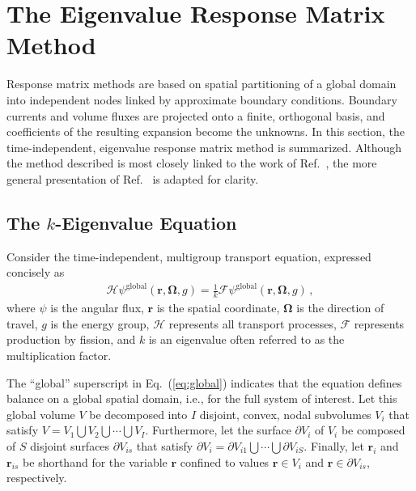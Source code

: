 \documentclass[5p,times,twocolumn,10pt]{elsarticle}
\newcommand{\oper}[1]{\mathcal{#1}}
\newcommand{\EQ}[1]{Eq.~(\ref{#1})}               %
\newcommand{\REF}[1]{Ref.~\citen{#1}}               %
\begin{document}
    \section{The Eigenvalue Response Matrix Method}
    
    Response matrix methods are based on spatial partitioning of a global 
    domain 
    into independent nodes linked by approximate boundary conditions. Boundary 
    currents and volume fluxes are projected onto a finite, orthogonal basis,
    and coefficients of the resulting expansion become the unknowns. In this 
    section, the time-independent, eigenvalue response matrix method  is 
    summarized.  Although the method described is most closely linked to the 
    work of \REF{RobertsSerment}, the more general presentation of 
    \REF{roberts2014hot} is adapted for clarity.
    
    \subsection{The $k$-Eigenvalue Equation}
    
    Consider the time-independent, multigroup transport equation, expressed 
    concisely as
    \begin{equation}
        \begin{split}
            \oper{H}\psi^{\mathrm{global}}(\mathbf{r},\bm{\Omega},g) = 
            \frac{1}{k} \oper{F} 
            \psi^{\mathrm{global}}(\mathbf{r},\bm{\Omega},g)  \, ,
        \end{split}
        \label{eq:global}
    \end{equation}
    where $\psi$ is the angular flux, $\mathbf{r}$ is the spatial coordinate, 
    $\bm{\Omega}$ is the direction of travel, $g$ is the energy group, 
    $\oper{H}$ represents all transport processes, $\oper{F}$ represents 
    production by fission, and $k$ is an eigenvalue often referred to as the 
    multiplication factor. 
    
    The ``global'' superscript in \EQ{eq:global} indicates that the equation 
    defines balance on a global spatial domain, i.e., for the full system of 
    interest. Let this global volume $V$ be decomposed into $I$ disjoint, 
    convex, nodal subvolumes $V_i$  that satisfy $V = V_1 \bigcup V_2 
    \bigcup \cdots \bigcup V_I$. Furthermore, let the surface $\partial V_i$ 
    of $V_i$ be composed of $S$ disjoint surfaces $\partial V_{is}$ 
    that satisfy $\partial V_i = \partial V_{i1} \bigcup \cdots \bigcup 
    \partial V_{iS}$. Finally, let $\mathbf{r}_i$ and 
    $\mathbf{r}_{is}$ be shorthand for the variable $\mathbf{r}$ confined 
    to values $\mathbf{r}\in V_i$ and $\mathbf{r} \in \partial V_{is}$, 
    respectively. 
    
\end{document}
